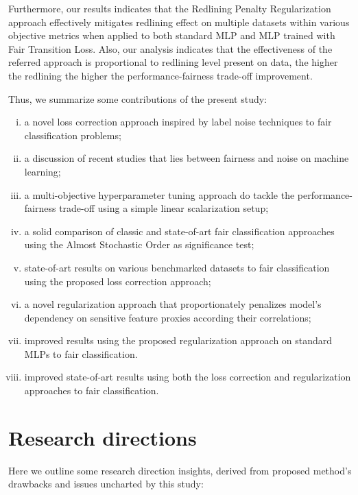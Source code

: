 Furthermore, our results indicates that the Redlining Penalty Regularization approach effectively mitigates redlining effect on multiple datasets within various objective metrics when applied to both standard MLP and MLP trained with Fair Transition Loss. Also, our analysis indicates that the effectiveness of the referred approach is proportional to redlining level present on data, the higher the redlining the higher the performance-fairness trade-off improvement.

Thus, we summarize some contributions of the present study:

\begin{enumerate}[(i)]
    \item a novel loss correction approach inspired by label noise techniques to fair classification problems;
    \item a discussion of recent studies that lies between fairness and noise on machine learning;
    \item a multi-objective hyperparameter tuning approach do tackle the performance-fairness trade-off using a simple linear scalarization setup;
    \item a solid comparison of classic and state-of-art fair classification approaches using the Almost Stochastic Order as significance test;
    \item state-of-art results on various benchmarked datasets to fair classification using the proposed loss correction approach;
    \item a novel regularization approach that proportionately penalizes model's dependency on sensitive feature proxies according their correlations;
    \item improved results using the proposed regularization approach on standard MLPs to fair classification.
    \item improved state-of-art results using both the loss correction and regularization approaches to fair classification.
\end{enumerate}

\section{Research directions}

Here we outline some research direction insights, derived from proposed method's drawbacks and issues uncharted by this study:

